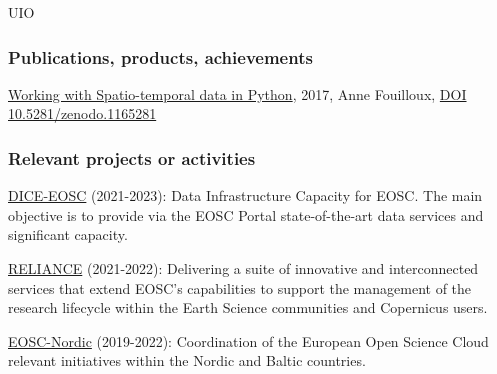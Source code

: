 \begin{sitedescription}{UIO}

    
    
    
    


    \subsubsection*{Publications, products, achievements}

    \begin{compactenum}

    \item \href{https://annefou.github.io/metos_python/}{Working with Spatio-temporal data in Python}, 2017, Anne Fouilloux, \href{https://zenodo.org/badge/latestdoi/96184802}{DOI 10.5281/zenodo.1165281}
    \end{compactenum}

    \subsubsection*{Relevant projects or activities}

    \begin{compactenum}


    \item \href{https://www.dice-eosc.eu/}{DICE-EOSC} \label{desc:diceeosc} (2021-2023):
    Data Infrastructure Capacity for EOSC. The main objective is to provide via the EOSC Portal state-of-the-art data services and significant capacity.

    \item \href{https://www.reliance-project.eu/}{RELIANCE} \label{desc:reliance} (2021-2022):
    Delivering a suite of innovative and interconnected services that extend EOSC's capabilities to support the management of the research lifecycle within the Earth Science communities and Copernicus users.

    \item \href{https://www.eosc-nordic.eu/}{EOSC-Nordic} \label{desc:eoscnordic} (2019-2022):
    Coordination of the European Open Science Cloud relevant initiatives within the Nordic and Baltic countries.


\end{compactenum}
\end{sitedescription}
